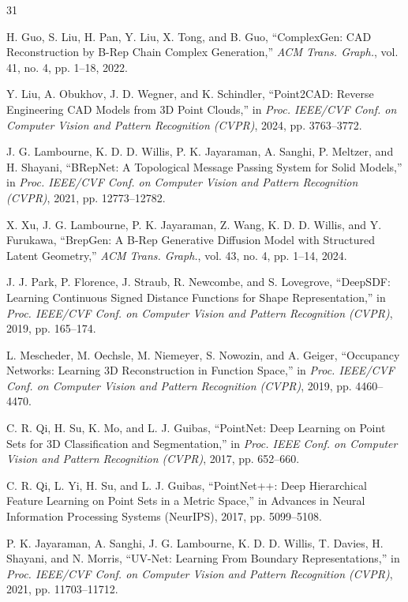 \documentclass{ieeeaccess}
\providecommand{\DIFaddbegin}{} %
\providecommand{\DIFaddend}{} %
\begin{document}
\DIFaddbegin \begin{thebibliography}{31}

\DIFaddend {}
H. Guo, S. Liu, H. Pan, Y. Liu, X. Tong, and B. Guo,
``ComplexGen: CAD Reconstruction by B-Rep Chain Complex Generation,''
\emph{ACM Trans. Graph.}, vol. 41, no. 4, pp. 1--18, 2022.

Y. Liu, A. Obukhov, J. D. Wegner, and K. Schindler,
``Point2CAD: Reverse Engineering CAD Models from 3D Point Clouds,''
in \emph{Proc. IEEE/CVF Conf. on Computer Vision and Pattern Recognition (CVPR)}, 2024, pp. 3763--3772.

J. G. Lambourne, K. D. D. Willis, P. K. Jayaraman, A. Sanghi, P. Meltzer, and H. Shayani,
``BRepNet: A Topological Message Passing System for Solid Models,''
in \emph{Proc. IEEE/CVF Conf. on Computer Vision and Pattern Recognition (CVPR)}, 2021, pp. 12773--12782.

X. Xu, J. G. Lambourne, P. K. Jayaraman, Z. Wang, K. D. D. Willis, and Y. Furukawa,
``BrepGen: A B-Rep Generative Diffusion Model with Structured Latent Geometry,''
\emph{ACM Trans. Graph.}, vol. 43, no. 4, pp. 1--14, 2024.

J. J. Park, P. Florence, J. Straub, R. Newcombe, and S. Lovegrove,
``DeepSDF: Learning Continuous Signed Distance Functions for Shape Representation,''
in \emph{Proc. IEEE/CVF Conf. on Computer Vision and Pattern Recognition (CVPR)}, 2019, pp. 165--174.

L. Mescheder, M. Oechsle, M. Niemeyer, S. Nowozin, and A. Geiger,
``Occupancy Networks: Learning 3D Reconstruction in Function Space,''
in \emph{Proc. IEEE/CVF Conf. on Computer Vision and Pattern Recognition (CVPR)}, 2019, pp. 4460--4470.

C. R. Qi, H. Su, K. Mo, and L. J. Guibas,
``PointNet: Deep Learning on Point Sets for 3D Classification and Segmentation,''
in \emph{Proc. IEEE Conf. on Computer Vision and Pattern Recognition (CVPR)}, 2017, pp. 652--660.

C. R. Qi, L. Yi, H. Su, and L. J. Guibas,
``PointNet++: Deep Hierarchical Feature Learning on Point Sets in a Metric Space,''
in Advances in Neural Information Processing Systems (NeurIPS), 2017, pp. 5099--5108.

P. K. Jayaraman, A. Sanghi, J. G. Lambourne, K. D. D. Willis, T. Davies, H. Shayani, and N. Morris,
``UV-Net: Learning From Boundary Representations,''
in \emph{Proc. IEEE/CVF Conf. on Computer Vision and Pattern Recognition (CVPR)}, 2021, pp. 11703--11712.


\end{thebibliography}
\end{document}
